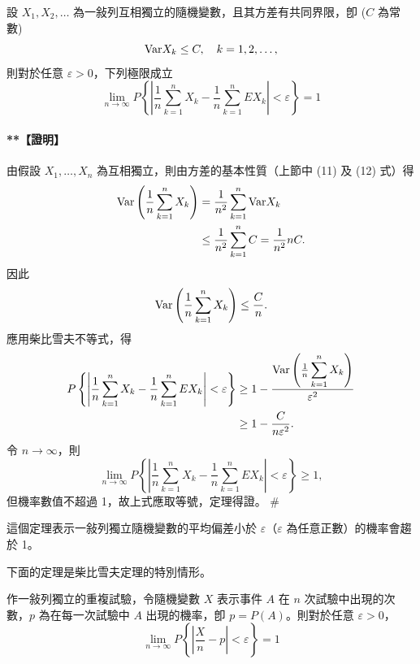 \medskip
\begin{theorem*}[柴比雪夫定理]
設 $X_1, X_2, \dots$ 為一敍列互相獨立的隨機變數，且其方差有共同界限，卽 ($C$ 為常數)
\[
\text{Var} X_k \le C, \quad k = 1, 2, \dots,
\]
則對於任意 $\varepsilon > 0$，下列極限成立
\begin{equation}
\lim_{n \to \infty} P\left\{ \left| \frac{1}{n}\sum_{k=1}^n X_k - \frac{1}{n}\sum_{k=1}^n EX_k \right| < \varepsilon \right\} = 1 \tag{2}\label{eq:b5-5-3-2}
\end{equation}
\end{theorem*}
\paragraph{**【證明】}
由假設 $X_1, \dots, X_n$ 為互相獨立，則由方差的基本性質（上節中 (11) 及 (12) 式）得
\begin{align*}
\text{Var}\left(\frac{1}{n}\sum_{k=1}^n X_k\right) &= \frac{1}{n^2}\sum_{k=1}^n \text{Var} X_k \\
&\le \frac{1}{n^2}\sum_{k=1}^n C = \frac{1}{n^2} nC.
\end{align*}
因此
\[
\text{Var}\left(\frac{1}{n}\sum_{k=1}^n X_k\right) \le \frac{C}{n}.
\]
應用柴比雪夫不等式，得
\begin{align*}
P\left\{ \left| \frac{1}{n}\sum_{k=1}^n X_k - \frac{1}{n}\sum_{k=1}^n EX_k \right| < \varepsilon \right\} &\ge 1 - \frac{\text{Var}\left(\frac{1}{n}\displaystyle\sum_{k=1}^n X_k\right)}{\varepsilon^2} \\
&\ge 1 - \frac{C}{n\varepsilon^2}.
\end{align*}
令 $n \to \infty$，則
\[
\lim_{n \to \infty} P\left\{ \left| \frac{1}{n}\sum_{k=1}^n X_k - \frac{1}{n}\sum_{k=1}^n EX_k \right| < \varepsilon \right\} \ge 1,
\]
但機率數值不超過 1，故上式應取等號，定理得證。 \hfill\#

這個定理表示一敍列獨立隨機變數的平均偏差小於 $\varepsilon$（$\varepsilon$ 為任意正數）的機率會趨於 1。

下面的定理是柴比雪夫定理的特別情形。

\medskip
\begin{theorem*}
作一敍列獨立的重複試驗，令隨機變數 $X$ 表示事件 $A$ 在 $n$ 次試驗中出現的次數，$p$ 為在每一次試驗中 $A$ 出現的機率，卽 $p = P(A)$。則對於任意 $\varepsilon > 0$，
\begin{equation}
\lim_{n \to \infty} P\left\{ \left| \frac{X}{n} - p \right| < \varepsilon \right\} = 1 \tag{3}\label{eq:b5-5-3-3}
\end{equation}
\end{theorem*}
